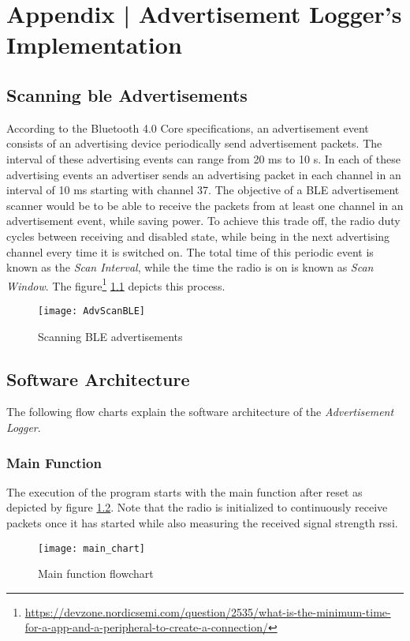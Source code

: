 \chapter{Appendix | Advertisement Logger's Implementation} \label{ApdxAdvLog}

\section{Scanning \gls{ble} Advertisements}

According to the Bluetooth 4.0 Core specifications, an advertisement event consists of an advertising device periodically send advertisement packets. The interval of these advertising events can range from 20 ms to 10 s. In each of these advertising events an advertiser sends an advertising packet in each channel in an interval of 10 ms starting with channel 37. The objective of a BLE advertisement scanner would be to be able to receive the packets from at least one channel in an advertisement event, while saving power. To achieve this trade off, the radio duty cycles between receiving and disabled state, while being in the next advertising channel every time it is switched on. The total time of this periodic event is known as the \emph{Scan Interval}, while the time the radio is on is known as \emph{Scan Window}. The figure\footnote{\href{https://devzone.nordicsemi.com/question/2535/what-is-the-minimum-time-for-a-app-and-a-peripheral-to-create-a-connection/}{https://devzone.nordicsemi.com/question/2535/what-is-the-minimum-time-for-a-app-and-a-peripheral-to-create-a-connection/}} \ref{fig:AdvScanBLE} depicts this process.

\begin{figure}[h]
\centering
\texttt{[image: AdvScanBLE]}
\caption{Scanning BLE advertisements}
\label{fig:AdvScanBLE}
\end{figure}

\section{Software Architecture}
The following flow charts explain the software architecture of the \emph{Advertisement Logger}.
\subsection{Main Function}
The execution of the program starts with the main function after reset as depicted by figure \ref{fig:main_chart}. Note that the radio is initialized to continuously receive packets once it has started while also measuring the received signal strength \acrshort{rssi}.
\begin{figure}[h]
\centering
\vspace{80pt}
\texttt{[image: main\_chart]}
\caption{Main function flowchart}
\vspace{80pt}
\label{fig:main_chart}
\end{figure}
\clearpage

